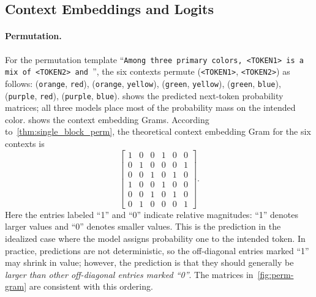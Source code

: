 \documentclass[11pt]{article}
\begin{document}
\subsection{Context Embeddings and Logits}

\paragraph{Permutation.}
For the permutation template ``\texttt{Among three primary colors, <TOKEN1> is a mix of <TOKEN2> and \textvisiblespace}'', the six contexts permute (\texttt{<TOKEN1>}, \texttt{<TOKEN2>}) as follows:
(\texttt{orange}, \texttt{red}), (\texttt{orange}, \texttt{yellow}), (\texttt{green}, \texttt{yellow}), (\texttt{green}, \texttt{blue}), (\texttt{purple}, \texttt{red}), (\texttt{purple}, \texttt{blue}).
 shows the predicted next-token probability matrices; all three models place most of the probability mass on the intended color.  shows the context embedding Grams. According to~\cref{thm:single_block_perm}, the theoretical context embedding Gram for the six contexts is
\[
\begin{bmatrix}
1&0&0&1&0&0\\
0&1&0&0&0&1\\
0&0&1&0&1&0\\
1&0&0&1&0&0\\
0&0&1&0&1&0\\
0&1&0&0&0&1
\end{bmatrix}.
\]
Here the entries labeled ``1'' and ``0'' indicate relative magnitudes: ``1'' denotes larger values and ``0'' denotes smaller values. This is the prediction in the idealized case where the model assigns probability one to the intended token. In practice, predictions are not deterministic, so the off-diagonal entries marked ``1'' may shrink in value; however, the prediction is that they should generally be \emph{larger than other off-diagonal entries marked ``0''}. The matrices in~\cref{fig:perm-gram} are consistent with this ordering.
\end{document}
